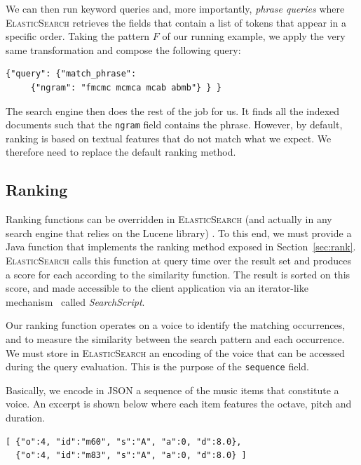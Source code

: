 \documentclass[letterpaper, 11pt]{article}
\def\elasticsearch/{\textsc{ElasticSearch}}
\begin{document}
We
can then run keyword queries and, more importantly, \emph{phrase queries} where \elasticsearch/ retrieves
the fields that contain a list of tokens that appear in a specific order. Taking the pattern $F$
of our running example, we apply
the very same transformation and compose the following query:

\begin{small}
\begin{verbatim}
{"query": {"match_phrase": 
     {"ngram": "fmcmc mcmca mcab abmb"} } }
\end{verbatim}
\end{small}

The search engine then does the rest of the job for us. It finds all the indexed documents such that the
\texttt{ngram} field contains the phrase. However, by default, ranking is based on textual features
that do not match what we expect. We therefore need to replace the default ranking method.

\subsection{Ranking}

Ranking functions can be overridden in \elasticsearch/ (and actually in any search engine that relies
on the Lucene library) \cite{Lucene08,Tra12}. To this end, we must provide a Java function that implements the ranking method exposed
in Section~\ref{sec:rank}. \elasticsearch/ calls this function at query time over the result set
and produces a  score for each according to the similarity function. The result is sorted on this score, and made accessible
to the client application via an iterator-like mechanism~\cite{doc-dsl-ES} called \textit{SearchScript}.

Our ranking function operates on a voice to identify the matching occurrences, and to measure
the similarity between the search pattern and each occurrence. We must store
in \elasticsearch/ an encoding of the voice that can be accessed during the query evaluation. This
is the purpose of the \texttt{sequence} field.

Basically, we encode in JSON a sequence of the music items that constitute a voice. An excerpt
is shown below where each item features the octave, pitch and duration.

\begin{footnotesize}
\begin{verbatim}
[ {"o":4, "id":"m60", "s":"A", "a":0, "d":8.0}, 
  {"o":4, "id":"m83", "s":"A", "a":0, "d":8.0} ]
\end{verbatim}
\end{footnotesize}
\end{document}
